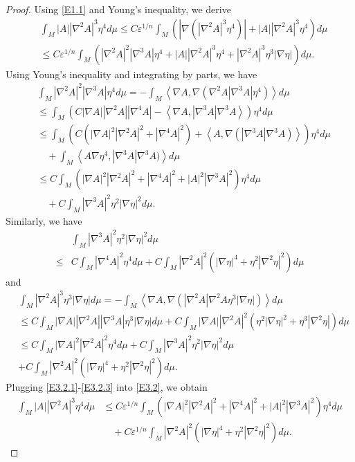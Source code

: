 \documentclass{amsart}
\theoremstyle{definition}
\numberwithin{equation}{section}
\begin{document}
\begin{proof}
Using \eqref{E1.1} and Young's inequality, we derive
\begin{align}\label{E3.2}
& \int_{M} |A| |\nabla^2 A|^3  \eta^4   d\mu\leq  C\varepsilon^{1/n}\int_{M} (|\nabla (|\nabla^2A|^3
\eta^4)| +|A| |\nabla^2 A|^3  \eta^4 ) d\mu  \\
&\leq C\varepsilon^{1/n}\int_{M} ( |\nabla^{2} A |^2 |\nabla^{3} A|   \eta^4+|A| |\nabla^2 A|^3  \eta^4 + |\nabla^2A|^3\eta^3|\nabla \eta|)
d\mu.\nonumber
 \end{align}
Using Young's inequality and integrating by parts,  we have
 \begin{align}\label{E3.2.1}
& \int_{M}|\nabla^{2} A |^2 |\nabla^{3} A|   \eta^4 d\mu=-\int_{M}\left <\nabla  A , \nabla (\nabla^{2} A  |\nabla^{3} A|   \eta^4)\right >
d\mu \\
&\leq \int_{M} ( C|\nabla  A|  |\nabla^{2} A | |\nabla^4 A|- \left <\nabla A, |\nabla^{3} A|\nabla^3A\right>  )  \eta^4
d\mu\nonumber\\
& \leq  \int_{M} (C( |\nabla  A|^2  |\nabla^{2} A |^2+ |\nabla^4 A|^2)+ \left < A, \nabla (|\nabla^{3} A|\nabla^3A)\right>  )
\eta^4  d\mu\nonumber\\
&\quad  + \int_{M}  \left < A \nabla  \eta^4, |\nabla^{3} A|\nabla^3A)\right>
 d\mu\nonumber\\
& \leq C \int_{M} ( |\nabla  A|^2  |\nabla^{2} A |^2+ |\nabla^4 A|^2+  |A|^2 |\nabla^3 A|^2   )  \eta^4  d\mu \nonumber
\\
& \quad  +C \int_{M}   |\nabla^3 A|^2 \eta^2 |\nabla \eta|^2  d\mu. \nonumber
 \end{align}
 Similarly, we have
 \begin{align}\label{E3.2.2}
& \int_{M}   |\nabla^3 A|^2 \eta^2 |\nabla \eta|^2  d\mu   \\
\leq & C \int_{M}   |\nabla^4 A|^2\eta^4  d\mu
    +C \int_{M} |\nabla^2 A|^2 (|\nabla \eta|^4 +\eta^2 |\nabla^2\eta|^2)   d\mu  \nonumber
 \end{align}
and
  \begin{align}\label{E3.2.3}
  &\int_{M} |\nabla^2A|^3\eta^3|\nabla \eta| d\mu=-\int_{M}\left < \nabla  A,  \nabla (|\nabla^2A| \nabla^2A\eta^3|\nabla \eta| )\right >
  d\mu\\
  &\leq C\int_{M} |\nabla  A|   |\nabla^2A| |\nabla^3A|\eta^3|\nabla \eta| d\mu + C\int_{M} |\nabla  A|   |\nabla^2A|^2 (\eta^2|\nabla \eta|^2
  + \eta^3|\nabla^2\eta|) d\mu \nonumber\\
  &\leq C\int_{M} |\nabla  A|^2   |\nabla^2A|^2\eta^4 d\mu + C\int_{M}  |\nabla^3A|^2\eta^2|\nabla \eta|^2 d\mu\nonumber \\
  &+ C\int_{M}    |\nabla^2A|^2 ( |\nabla \eta|^4 + \eta^2|\nabla^2\eta|^2) d\mu .\nonumber
 \end{align}
Plugging \eqref{E3.2.1}-\eqref{E3.2.3} into   \eqref{E3.2}, we obtain
\begin{align}\label{E3.3}
  \int_{M} |A| |\nabla^2 A|^3  \eta^4   d\mu
   & \leq C \varepsilon^{1/n}\int_{M} ( |\nabla  A|^2  |\nabla^{2} A |^2+ |\nabla^4 A|^2+  |A|^2 |\nabla^3 A|^2   )  \eta^4  d\mu
\\
& \quad  +  C\varepsilon^{1/n}\int_{M}    |\nabla^2A|^2 ( |\nabla \eta|^4 + \eta^2|\nabla^2\eta|^2) d\mu. \nonumber
 \end{align}



\end{proof}
\end{document}
